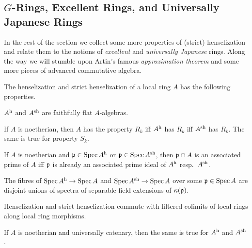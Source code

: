 
\subsection{\texorpdfstring{$G$}{G}-Rings, Excellent Rings, and Universally Japanese Rings}
In the rest of the section we collect some more properties of (strict) henselization and relate them to the notions of \emph{excellent} and \emph{universally Japanese} rings. Along the way we will stumble upon Artin's famous \emph{approximation theorem} and some more pieces of advanced commutative algebra.
\begin{fact}\label{fact:moarHenselization}
	The henselization and strict henselization of a local ring $A$ has the following properties.
	\begin{alphanumerate}
		\item $A^{\mathrm{h}}$ and $A^{\mathrm{sh}}$ are faithfully flat $A$-algebras.
		\item If $A$ is noetherian, then $A$ has the property $R_k$ iff $A^{\mathrm{h}}$ has $R_k$ iff $A^{\mathrm{sh}}$ has $R_k$. The same is true for property $S_k$.
		\item If $A$ is noetherian and $\mathfrak{p}\in \operatorname{Spec} A^{\mathrm{h}}$ or $\mathfrak{p}\in\operatorname{Spec} A^{\mathrm{sh}}$, then $\mathfrak{p}\cap A$ is an associated prime of $A$ iff $\mathfrak{p}$ is already an associated prime ideal of $A^{\mathrm{h}}$ resp.\ $A^{\mathrm{sh}}$.
		\item The fibres of $\Spec A^\h\morphism \Spec A$ and $\Spec A^\sh\morphism \Spec A$ over some $\mathfrak{p}\in \operatorname{Spec} A$ are disjoint unions of spectra of separable field extensions of $\kappa(\mathfrak{p})$.
		\item Henselization and strict henselization commute with filtered colimits of local rings along local ring morphisms.
		\item If $A$ is noetherian and universally catenary, then the same is true for $A^{\mathrm{h}}$ and $A^{\mathrm{sh}}$.
	\end{alphanumerate}
\end{fact}
